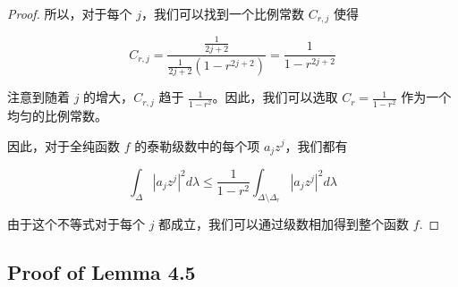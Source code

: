 \begin{proof}
所以，对于每个 \(j\)，我们可以找到一个比例常数 \(C_{r,j}\) 使得

\[
C_{r,j} = \frac{\frac{1}{2j+2}}{\frac{1}{2j+2}(1-r^{2j+2})} = \frac{1}{1-r^{2j+2}}
\]

注意到随着 \(j\) 的增大，\(C_{r,j}\) 趋于 \(\frac{1}{1-r^2}\)。因此，我们可以选取 \(C_r = \frac{1}{1-r^2}\) 作为一个均匀的比例常数。

因此，对于全纯函数 \(f\) 的泰勒级数中的每个项 \(a_j z^j\)，我们都有

\[
\int_\Delta |a_j z^j|^2 d\lambda \leq \frac{1}{1-r^2} \int_{\Delta \setminus \Delta_r} |a_j z^j|^2 d\lambda
\]

由于这个不等式对于每个 \(j\) 都成立，我们可以通过级数相加得到整个函数 \(f\).
\end{proof}

\subsection{Proof of Lemma 4.5}

